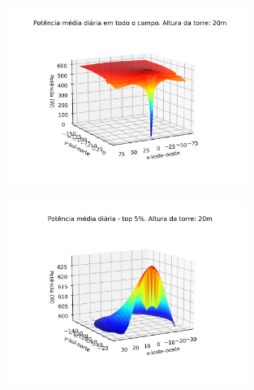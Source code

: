 \documentclass[12pt,notheorems,hyperref={pdfauthor=Professor Rafael Nardi}]{beamer}
\begin{document}
\begin{frame}%
	\begin{figure}[htpb]
		\centering
		\includegraphics[width=0.7\textwidth]{../../plots/tower_shadow_correction/square_grid_along_day_20mfull_grid.png}
		\label{fig:heliost_field_average_20m}
	\end{figure}
\end{frame}

\begin{frame}%
	\begin{figure}[htpb]
		\centering
		\includegraphics[width=0.7\textwidth]{../../plots/tower_shadow_correction/square_grid_along_day_20mtop_5_most_powerfull.png}
		\label{fig:heliost_field_average_20m_top5}
	\end{figure}
\end{frame}
\end{document}

